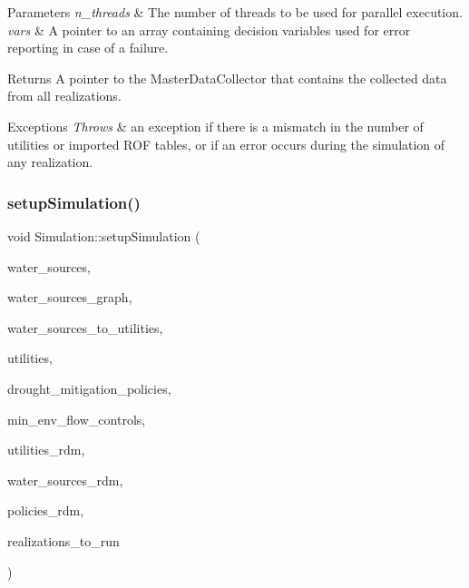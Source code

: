 \begin{DoxyParams}{Parameters}
{\em n\+\_\+threads} & The number of threads to be used for parallel execution. \\
\hline
{\em vars} & A pointer to an array containing decision variables used for error reporting in case of a failure.\\
\hline
\end{DoxyParams}
\begin{DoxyReturn}{Returns}
A pointer to the {\ttfamily Master\+Data\+Collector} that contains the collected data from all realizations.
\end{DoxyReturn}

\begin{DoxyExceptions}{Exceptions}
{\em Throws} & an exception if there is a mismatch in the number of utilities or imported R\+OF tables, or if an error occurs during the simulation of any realization. \\
\hline
\end{DoxyExceptions}
\mbox{\label{classSimulation_ac9ff965191f13b1ce044344fd1e5d0ac}} 
\subsubsection{\texorpdfstring{setup\+Simulation()}{setupSimulation()}}
{\footnotesize\ttfamily void Simulation\+::setup\+Simulation (\begin{DoxyParamCaption}\item[{vector$<$ \mbox{\hyperlink{classWaterSource}{Water\+Source}} $\ast$$>$ \&}]{water\+\_\+sources,  }\item[{Graph \&}]{water\+\_\+sources\+\_\+graph,  }\item[{const vector$<$ vector$<$ int $>$$>$ \&}]{water\+\_\+sources\+\_\+to\+\_\+utilities,  }\item[{vector$<$ \mbox{\hyperlink{classUtility}{Utility}} $\ast$$>$ \&}]{utilities,  }\item[{const vector$<$ Drought\+Mitigation\+Policy $\ast$$>$ \&}]{drought\+\_\+mitigation\+\_\+policies,  }\item[{vector$<$ Min\+Env\+Flow\+Control $\ast$$>$ \&}]{min\+\_\+env\+\_\+flow\+\_\+controls,  }\item[{vector$<$ vector$<$ double $>$$>$ \&}]{utilities\+\_\+rdm,  }\item[{vector$<$ vector$<$ double $>$$>$ \&}]{water\+\_\+sources\+\_\+rdm,  }\item[{vector$<$ vector$<$ double $>$$>$ \&}]{policies\+\_\+rdm,  }\item[{vector$<$ unsigned long $>$ \&}]{realizations\+\_\+to\+\_\+run }\end{DoxyParamCaption})}




